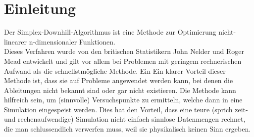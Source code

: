 \section{Einleitung}
Der Simplex-Downhill-Algorithmus ist eine Methode zur Optimierung nicht-linearer n-dimensionaler Funktionen. \\
Dieses Verfahren wurde von den britischen Statistikern John Nelder und Roger Mead entwickelt und gilt vor allem bei Problemen mit geringem rechnerischen Aufwand als die schnellstmögliche Methode. Ein Ein klarer Vorteil dieser Methode ist, dass sie auf Probleme angewendet werden kann, bei denen  die Ableitungen nicht bekannt sind oder gar nicht existieren. Die Methode kann hilfreich sein, um (sinnvolle) Versuchspunkte zu ermitteln, welche dann in eine Simulation eingespeist werden. Dies hat den Vorteil, dass eine teure (sprich zeit- und rechenaufwendige) Simulation nicht einfach sinnlose Datenmengen rechnet, die man schlussendlich verwerfen muss, weil sie physikalisch keinen Sinn ergeben.  
